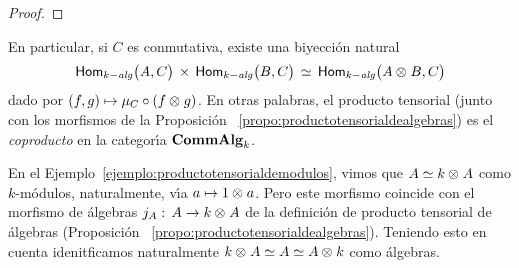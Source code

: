 \begin{proof}
\end{proof}

En particular, si $C$ es conmutativa, existe una biyecci\'{o}n natural
\begin{equation}
	\label{eq:morfismosdesdeelproductotensorialdealgebras}
	\Homalg\big(A,C\big) \,\times\,\Homalg\big(B,C\big) \,\simeq\,
		\Homalg\big(A\tensor B,C\big)
\end{equation}
%
dado por $(f,g)\mapsto \mu_C\circ(f\tensor g)$. En otras palabras, el producto
tensorial (junto con los morfismos de la Proposici\'{o}n~%
\ref{propo:productotensorialdealgebras}) es el \emph{coproducto} en la
categor\'{\i}a $\CommAlg[k]$.

\begin{obsProductoTensorialDeAlgebras}%
	\label{obs:productotensorialdealgebrasejemplomodulos}
	En el Ejemplo~\ref{ejemplo:productotensorialdemodulos}, vimos que
	$A\simeq k\tensor A$ como $k$-m\'{o}dulos, naturalmente, v\'{\i}a
	$a\mapsto 1\tensor a$. Pero este morfismo coincide con el morfismo de
	\'{a}lgebras $j_A:\,A\rightarrow k\tensor A$ de la definici\'{o}n de
	producto tensorial de \'{a}lgebras (Proposici\'{o}n~%
	\ref{propo:productotensorialdealgebras}). Teniendo esto en cuenta
	idenitficamos naturalmente $k\tensor A\simeq A\simeq A\tensor k$ como
	\'{a}lgebras.
\end{obsProductoTensorialDeAlgebras}

